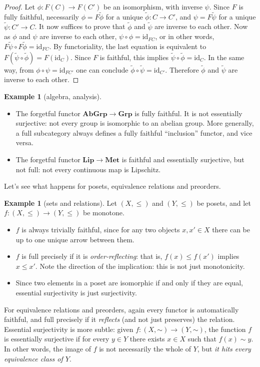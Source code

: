 \documentclass[12pt,oneside]{scrbook}
\def\simord{\mathord\sim}
\numberwithin{equation}{section}
\theoremstyle{plain}
\theoremstyle{definition}
\newtheorem{eg}[thm]{Example}
\newcommand{\cat}[1]{{\mathbf{#1}}} %
\newcommand{\Grp}{\cat{Grp}}
\DeclareMathOperator{\1}{\mathbbm{1}}
\DeclareMathOperator{\2}{\mathbbm{2}}
\newcommand{\id}{\mathrm{id}} %
\begin{document}
\begin{proof}
 Let $\phi:F(C)\to F(C')$ be an isomorphism, with inverse $\psi$. Since $F$ is fully faithful, necessarily $\phi=F\tilde{\phi}$ for a unique $\tilde{\phi}:C\to C'$, and $\psi=F\tilde{\psi}$ for a unique $\tilde{\psi}:C'\to C$. It now suffices to prove that $\tilde{\phi}$ and $\tilde{\psi}$ are inverse to each other. Now as $\phi$ and $\psi$ are inverse to each other, $\psi\circ\phi=\id_{FC}$, or in other words, $F\tilde{\psi}\circ F\tilde{\phi}=\id_{FC}$. By functoriality, the last equation is equivalent to $F(\tilde{\psi}\circ \tilde{\phi})=F(\id_C)$. Since $F$ is faithful, this implies $\tilde{\psi}\circ \tilde{\phi}=\id_C$. In the same way, from $\phi\circ\psi=\id_{FC'}$ one can conclude $\tilde{\phi}\circ \tilde{\psi}=\id_{C'}$. Therefore $\tilde{\phi}$ and $\tilde{\psi}$ are inverse to each other.
\end{proof}


\begin{eg}[algebra, analysis]
\phantom{.}
 \begin{itemize}
  \item The forgetful functor $\cat{AbGrp}\to\Grp$ is fully faithful. It is not essentially surjective: not every group is isomorphic to an abelian group.
  More generally, a full subcategory always defines a fully faithful ``inclusion'' functor, and vice versa. 
  \item The forgetful functor $\cat{Lip}\to\cat{Met}$ is faithful and essentially surjective, but not full: not every continuous map is Lipschitz. 
 \end{itemize}
\end{eg}

Let's see what happens for posets, equivalence relations and preorders.

\begin{eg}[sets and relations]
 Let $(X,\le)$ and $(Y,\le)$ be posets, and let $f:(X,\le)\to (Y,\le)$ be monotone. 
 \begin{itemize}
  \item $f$ is always trivially faithful, since for any two objects $x,x'\in X$ there can be up to one unique arrow between them.
  \item $f$ is full precisely if it is \emph{order-reflecting}: that is, $f(x)\le f(x')$ implies $x\le x'$. Note the direction of the implication: this is not just monotonicity. 
  \item Since two elements in a poset are isomorphic if and only if they are equal, essential surjectivity is just surjectivity.
 \end{itemize}

 For equivalence relations and preorders, again every functor is automatically faithful, and full precisely if it \emph{reflects} (and not just preserves) the relation. Essential surjectivity is more subtle: given $f:(X,\simord)\to (Y,\simord)$, the function $f$ is essentially surjective if for every $y\in Y$ there exists $x\in X$ such that $f(x)\sim y$. In other words, the image of $f$ is not necessarily the whole of $Y$, but \emph{it hits every equivalence class of $Y$}. 
\end{eg}
\end{document}
